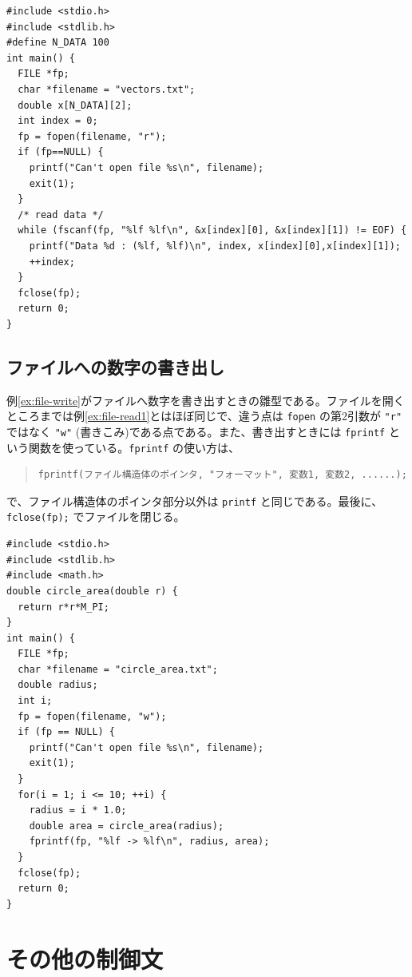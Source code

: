 \begin{reidai}\label{ex:file-read2}
\begin{verbatim}
#include <stdio.h>
#include <stdlib.h>
#define N_DATA 100
int main() {
  FILE *fp;
  char *filename = "vectors.txt";
  double x[N_DATA][2];
  int index = 0;
  fp = fopen(filename, "r");
  if (fp==NULL) {
    printf("Can't open file %s\n", filename);
    exit(1);
  }
  /* read data */
  while (fscanf(fp, "%lf %lf\n", &x[index][0], &x[index][1]) != EOF) {
    printf("Data %d : (%lf, %lf)\n", index, x[index][0],x[index][1]);
    ++index;
  }
  fclose(fp);
  return 0;
}
\end{verbatim}
\end{reidai}

\subsection{ファイルへの数字の書き出し}

例\ref{ex:file-write}がファイルへ数字を書き出すときの雛型である。ファイルを開くところまでは例\ref{ex:file-read1}とはほぼ同じで、違う点は \verb|fopen| の第2引数が \verb|"r"| ではなく \verb|"w"| (書きこみ)である点である。また、書き出すときには \verb|fprintf| という関数を使っている。\verb|fprintf| の使い方は、
\begin{quote}
\begin{verbatim}
fprintf(ファイル構造体のポインタ, "フォーマット", 変数1, 変数2, ......);
\end{verbatim}
\end{quote}
で、ファイル構造体のポインタ部分以外は \verb|printf| と同じである。最後に、\verb|fclose(fp);| でファイルを閉じる。
\begin{reidai}\label{ex:file-write}
\begin{verbatim}
#include <stdio.h>
#include <stdlib.h>
#include <math.h>
double circle_area(double r) {
  return r*r*M_PI;
}
int main() {
  FILE *fp;
  char *filename = "circle_area.txt";
  double radius;
  int i;
  fp = fopen(filename, "w");
  if (fp == NULL) {
    printf("Can't open file %s\n", filename);
    exit(1);
  }
  for(i = 1; i <= 10; ++i) {
    radius = i * 1.0;
    double area = circle_area(radius);
    fprintf(fp, "%lf -> %lf\n", radius, area);
  }
  fclose(fp);
  return 0;
}
\end{verbatim}
\end{reidai}

\section{その他の制御文}

